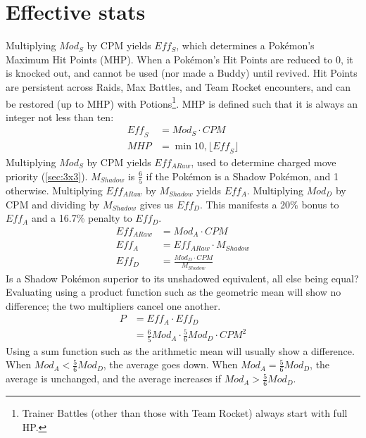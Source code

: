\section{Effective stats\label{sec:effectivestats}}
Multiplying $Mod_S$ by CPM yields $Eff_S$, which determines a Pokémon's Maximum Hit Points (MHP).
When a Pokémon's Hit Points are reduced to 0, it is knocked out, and cannot be
 used (nor made a Buddy) until revived.
Hit Points are persistent across Raids, Max Battles, and Team Rocket encounters,
 and can be restored (up to MHP) with Potions\footnote{Trainer Battles (other
 than those with Team Rocket) always start with full HP.}.
MHP is defined such that it is always an integer not less than ten:
\begin{align*}
 \mathit{Eff_S} &= \mathit{Mod_S} \cdot CPM \\
 MHP &= \min{10, \lfloor \mathit{Eff_S} \rfloor}
\end{align*}
Multiplying $Mod_S$ by CPM yields $Eff_{ARaw}$, used to determine charged move priority (\autoref{sec:3x3}).
$M_{Shadow}$ is $\frac{6}{5}$ if the Pokémon is a Shadow Pokémon, and 1 otherwise.
Multiplying $Eff_{ARaw}$ by $M_{Shadow}$ yields $Eff_A$.
Multiplying $Mod_D$ by CPM and dividing by $M_{Shadow}$ gives us $Eff_D$.
This manifests a 20\% bonus to $Eff_A$ and a 16.7\% penalty to $Eff_D$.
\begin{align*}
  Eff_{ARaw} &= Mod_A \cdot CPM\\
  Eff_A &= Eff_{ARaw} \cdot M_{Shadow} \\
 Eff_D &= \frac{Mod_D \cdot CPM}{M_{Shadow}}
\end{align*}
Is a Shadow Pokémon superior to its unshadowed equivalent, all else being equal?
Evaluating using a product function such as the geometric mean will show no difference;
 the two multipliers cancel one another.
\begin{align*}
  P &= Eff_A \cdot Eff_D\\
  &= \frac{6}{5}Mod_A \cdot \frac{5}{6}Mod_D \cdot CPM^2
\end{align*}
Using a sum function such as the arithmetic mean will usually show a difference.
When $Mod_A < \frac{5}{6}Mod_D$, the average goes down.
When $Mod_A = \frac{5}{6}Mod_D$, the average is unchanged,
 and the average increases if $Mod_A > \frac{5}{6}Mod_D$.

